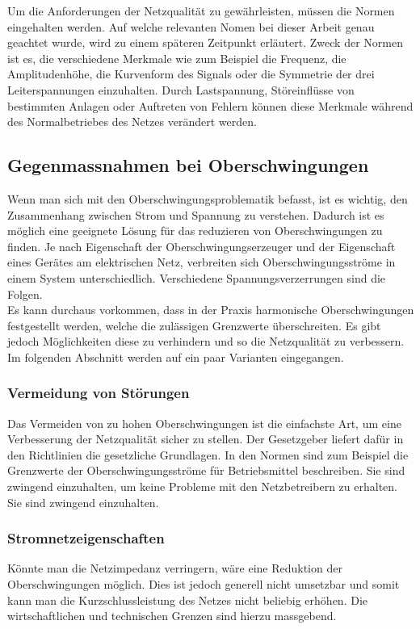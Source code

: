 Um die Anforderungen der Netzqualität zu gewährleisten, müssen die Normen eingehalten werden. Auf welche relevanten Nomen bei dieser Arbeit genau geachtet wurde, wird zu einem späteren Zeitpunkt erläutert. Zweck der Normen ist es, die verschiedene Merkmale wie zum Beispiel die Frequenz, die Amplitudenhöhe, die Kurvenform des Signals oder die Symmetrie der drei Leiterspannungen einzuhalten. Durch Lastspannung, Störeinflüsse von bestimmten Anlagen oder Auftreten von Fehlern können diese Merkmale während des Normalbetriebes des Netzes verändert werden. 


\subsection{Gegenmassnahmen bei Oberschwingungen}

Wenn man sich mit den Oberschwingungsproblematik befasst, ist es wichtig, den Zusammenhang zwischen Strom und Spannung zu verstehen. Dadurch ist es möglich eine geeignete Lösung für das reduzieren von Oberschwingungen zu finden. 
Je nach Eigenschaft der Oberschwingungserzeuger und der Eigenschaft eines Gerätes am elektrischen Netz, verbreiten sich Oberschwingungsströme in einem System unterschiedlich. Verschiedene Spannungsverzerrungen sind die Folgen.\\ 
Es kann durchaus vorkommen, dass in der Praxis harmonische Oberschwingungen festgestellt werden, welche die zulässigen Grenzwerte überschreiten. Es gibt jedoch Möglichkeiten diese zu verhindern und so die Netzqualität zu verbessern. Im folgenden Abschnitt werden auf ein paar Varianten eingegangen.

\subsubsection*{Vermeidung von Störungen}
Das Vermeiden von zu hohen Oberschwingungen ist die einfachste Art, um eine Verbesserung der Netzqualität sicher zu stellen. Der Gesetzgeber liefert dafür in den Richtlinien die gesetzliche Grundlagen. In den Normen sind zum Beispiel die Grenzwerte der Oberschwingungsströme für Betriebsmittel beschreiben. Sie sind zwingend einzuhalten, um keine Probleme mit den Netzbetreibern zu erhalten. Sie sind zwingend einzuhalten.

\subsubsection*{Stromnetzeigenschaften}
Könnte man die Netzimpedanz verringern, wäre eine Reduktion der Oberschwingungen möglich. Dies ist jedoch generell nicht umsetzbar und somit kann man die Kurzschlussleistung des Netzes nicht beliebig erhöhen. Die wirtschaftlichen und technischen Grenzen sind hierzu massgebend.  

